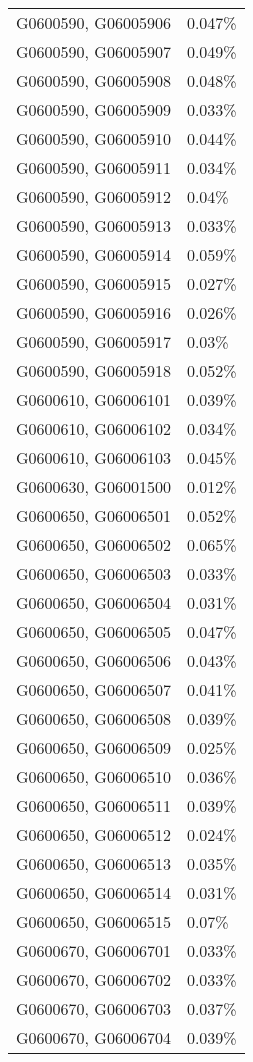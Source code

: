 \begin{longtable}[]{@{}ll@{}}
G0600590, G06005906 & 0.047\% \\
G0600590, G06005907 & 0.049\% \\
G0600590, G06005908 & 0.048\% \\
G0600590, G06005909 & 0.033\% \\
G0600590, G06005910 & 0.044\% \\
G0600590, G06005911 & 0.034\% \\
G0600590, G06005912 & 0.04\% \\
G0600590, G06005913 & 0.033\% \\
G0600590, G06005914 & 0.059\% \\
G0600590, G06005915 & 0.027\% \\
G0600590, G06005916 & 0.026\% \\
G0600590, G06005917 & 0.03\% \\
G0600590, G06005918 & 0.052\% \\
G0600610, G06006101 & 0.039\% \\
G0600610, G06006102 & 0.034\% \\
G0600610, G06006103 & 0.045\% \\
G0600630, G06001500 & 0.012\% \\
G0600650, G06006501 & 0.052\% \\
G0600650, G06006502 & 0.065\% \\
G0600650, G06006503 & 0.033\% \\
G0600650, G06006504 & 0.031\% \\
G0600650, G06006505 & 0.047\% \\
G0600650, G06006506 & 0.043\% \\
G0600650, G06006507 & 0.041\% \\
G0600650, G06006508 & 0.039\% \\
G0600650, G06006509 & 0.025\% \\
G0600650, G06006510 & 0.036\% \\
G0600650, G06006511 & 0.039\% \\
G0600650, G06006512 & 0.024\% \\
G0600650, G06006513 & 0.035\% \\
G0600650, G06006514 & 0.031\% \\
G0600650, G06006515 & 0.07\% \\
G0600670, G06006701 & 0.033\% \\
G0600670, G06006702 & 0.033\% \\
G0600670, G06006703 & 0.037\% \\
G0600670, G06006704 & 0.039\% \\

\end{longtable}
